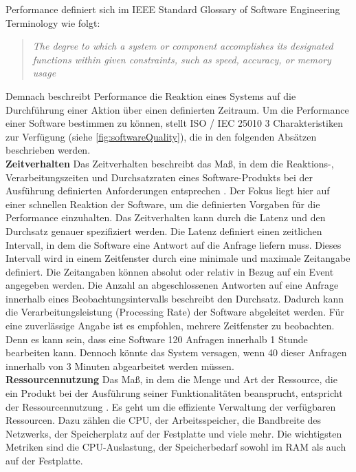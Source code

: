 \noindent
Performance definiert sich im IEEE Standard Glossary of Software Engineering Terminology wie folgt:
\begin{quote}
	\emph{\glqq The degree to which a system or component accomplishes its designated functions within given constraints, such as speed, accuracy, or memory usage\grqq{}} \cite{IEEE.}
\end{quote}

\noindent
Demnach beschreibt Performance die Reaktion eines Systems auf die Durchführung einer Aktion über einen definierten Zeitraum. Um die Performance einer Software bestimmen zu können, stellt ISO / IEC 25010 3 Charakteristiken zur Verfügung (siehe \autoref{fig:softwareQuality}), die in den folgenden Absätzen beschrieben werden.\\

\noindent
\textbf{Zeitverhalten}\newline
Das Zeitverhalten beschreibt das Maß, in dem die Reaktions-, Verarbeitungszeiten und Durchsatzraten eines Software-Produkts bei der Ausführung definierten Anforderungen entsprechen \cite{ISOIEC.}. Der Fokus liegt hier auf einer schnellen Reaktion der Software, um die definierten Vorgaben für die Performance einzuhalten. Das Zeitverhalten kann durch die Latenz und den Durchsatz genauer spezifiziert werden. Die Latenz definiert einen zeitlichen Intervall, in dem die Software eine Antwort auf die Anfrage liefern muss. Dieses Intervall wird in einem Zeitfenster durch eine minimale und maximale Zeitangabe definiert. Die Zeitangaben können absolut oder relativ in Bezug auf ein Event angegeben werden. Die Anzahl an abgeschlossenen Antworten auf eine Anfrage innerhalb eines Beobachtungsintervalls beschreibt den Durchsatz. Dadurch kann die Verarbeitungsleistung (Processing Rate) der Software abgeleitet werden. Für eine zuverlässige Angabe ist es empfohlen, mehrere Zeitfenster zu beobachten. Denn es kann sein, dass eine Software 120 Anfragen innerhalb 1 Stunde bearbeiten kann. Dennoch könnte das System versagen, wenn 40 dieser Anfragen innerhalb von 3 Minuten abgearbeitet werden müssen.\cite{Barbacci.1995}\\

\noindent
\textbf{Ressourcennutzung}\newline
Das Maß, in dem die Menge und Art der Ressource, die ein Produkt bei der Ausführung seiner Funktionalitäten beansprucht, entspricht der Ressourcennutzung \cite{ISOIEC.}. Es geht um die effiziente Verwaltung der verfügbaren Ressourcen. Dazu zählen die CPU, der Arbeitsspeicher, die Bandbreite des Netzwerks, der Speicherplatz auf der Festplatte und viele mehr. Die wichtigsten Metriken sind die CPU-Auslastung, der Speicherbedarf sowohl im RAM als auch auf der Festplatte.\cite{Barbacci.1995}\\

